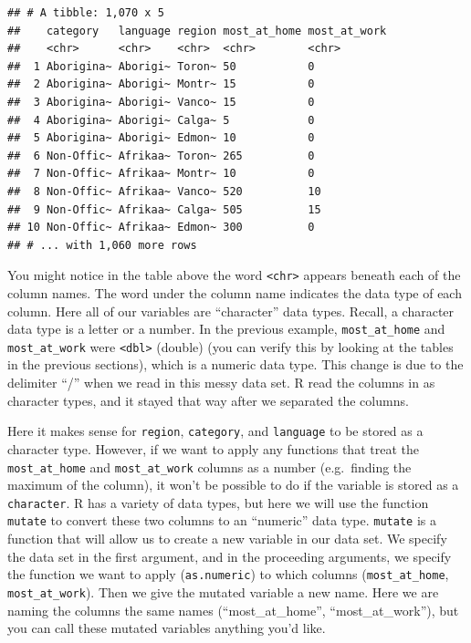 \documentclass[
]{krantz}
\begin{document}
\begin{verbatim}
## # A tibble: 1,070 x 5
##    category   language region most_at_home most_at_work
##    <chr>      <chr>    <chr>  <chr>        <chr>       
##  1 Aborigina~ Aborigi~ Toron~ 50           0           
##  2 Aborigina~ Aborigi~ Montr~ 15           0           
##  3 Aborigina~ Aborigi~ Vanco~ 15           0           
##  4 Aborigina~ Aborigi~ Calga~ 5            0           
##  5 Aborigina~ Aborigi~ Edmon~ 10           0           
##  6 Non-Offic~ Afrikaa~ Toron~ 265          0           
##  7 Non-Offic~ Afrikaa~ Montr~ 10           0           
##  8 Non-Offic~ Afrikaa~ Vanco~ 520          10          
##  9 Non-Offic~ Afrikaa~ Calga~ 505          15          
## 10 Non-Offic~ Afrikaa~ Edmon~ 300          0           
## # ... with 1,060 more rows
\end{verbatim}

You might notice in the table above the word \texttt{\textless{}chr\textgreater{}} appears beneath each of the column names. The word under the column name indicates the data type of each column. Here all of our variables are ``character'' data types. Recall, a character data type is a letter or a number. In the previous example, \texttt{most\_at\_home} and \texttt{most\_at\_work} were \texttt{\textless{}dbl\textgreater{}} (double) (you can verify this by looking at the tables in the previous sections), which is a numeric data type. This change is due to the delimiter ``/'' when we read in this messy data set. R read the columns in as character types, and it stayed that way after we separated the columns.

Here it makes sense for \texttt{region}, \texttt{category}, and \texttt{language} to be stored as a character type. However, if we want to apply any functions that treat the \texttt{most\_at\_home} and \texttt{most\_at\_work} columns as a number (e.g.~finding the maximum of the column), it won't be possible to do if the variable is stored as a \texttt{character}. R has a variety of data types, but here we will use the function \texttt{mutate} to convert these two columns to an ``numeric'' data type. \texttt{mutate} is a function that will allow us to create a new variable in our data set. We specify the data set in the first argument, and in the proceeding arguments, we specify the function we want to apply (\texttt{as.numeric}) to which columns (\texttt{most\_at\_home}, \texttt{most\_at\_work}). Then we give the mutated variable a new name. Here we are naming the columns the same names (``most\_at\_home'', ``most\_at\_work''), but you can call these mutated variables anything you'd like.
\end{document}

